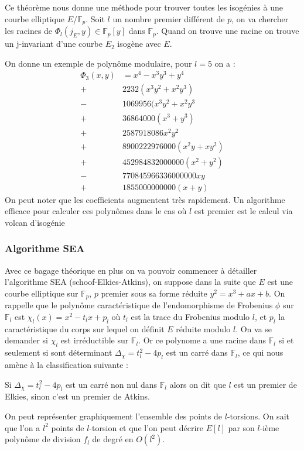 \documentclass[12pt]{article}
\begin{document}
Ce théorème nous donne une méthode pour trouver toutes les isogénies à une courbe elliptique $E$/$\mathbb{F}_p$. Soit $l$ un nombre premier différent de $p$, on va chercher les racines de $\Phi_l(j_E, y) \in \mathbb{F}_p[y]$ dans $\mathbb{F}_p$. Quand on trouve une racine on trouve un j-invariant d'une courbe $E_2$ isogène avec $E$. 

On donne un exemple de polynôme modulaire, pour $ l =5$ on a :
\begin{align*}
\Phi_3(x,y) &= x^4 -x^3y^3 + y^4 \\
 +& 2232(x^3y^2 + x^2y^3) \\
 -& 1069956(x^3y^2 + x^2y^3 \\
 +& 36864000(x^3 + y^3) \\
 +& 2587918086x^2y^2 \\
 +& 8900222976000(x^2y + xy^2) \\
 +& 452984832000000(x^2 + y^2) \\
 -& 770845966336000000xy \\
 +& 1855000000000(x+y) 
\end{align*}
On peut noter que les coefficients augmentent très rapidement. Un algorithme efficace pour calculer ces polynômes dans le cas où $l$ est premier est le calcul via volcan d'isogénie \cite{volcan}

\subsubsection{Algorithme SEA}
Avec ce bagage théorique en plus on va pouvoir commencer à détailler l'algorithme SEA (schoof-Elkies-Atkins), on suppose dans la suite que $E$ est une courbe elliptique sur $\mathbb{F}_p$, $p$ premier sous sa forme réduite $y^2 = x^3 + ax +b$. On rappelle que le polynôme caractéristique de l’endomorphisme de Frobenius $\phi$ sur $\mathbb{F}_l$ est $\chi_l(x) = x^2 - t_lx +p_l$ où $t_l$ est la trace du Frobenius modulo $l$, et $p_l$ la caractéristique du corps sur lequel on définit $E$ réduite modulo $l$. On va se demander si $\chi_l$ est irréductible sur $\mathbb{F}_l$. Or ce polynome a une racine dans $\mathbb{F}_l$ si et seulement si sont déterminant $\Delta_{\chi} = t_l^2 - 4p_l$ est un carré dans $\mathbb{F}_l$, ce qui nous amène à la classification suivante :

\begin{defi}
\label{Atkins's prime}
Si $\Delta_{\chi} = t_l^2 - 4p_l$ est un carré non nul dans $\mathbb{F}_l$ alors on dit que $l$ est un premier de Elkies, sinon c'est un premier de Atkins.
\end{defi}
\bigskip
On peut représenter graphiquement l'ensemble des points de $l$-torsions. On sait que l'on a $l^2$ points de $l$-torsion et que l'on peut décrire $E[l]$ par son $l$-ième polynôme de division $f_l$ de degré en $O(l^2)$.
\end{document}
